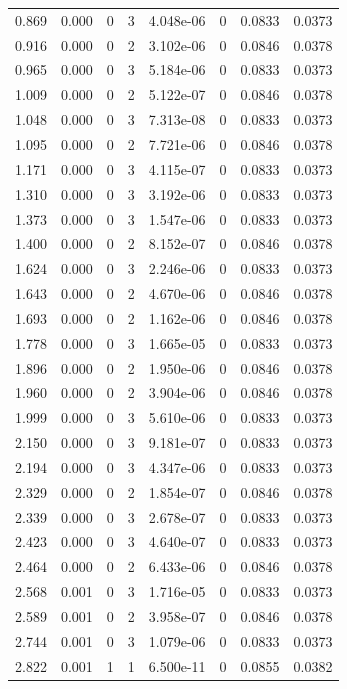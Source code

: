 \documentclass[preview]{standalone}
\begin{document}
{{\begin{tabular}{L{1.2cm}C{1.2cm} C{0.3cm}C{0.5cm} C{1.4cm}C{1.4cm} C{1.4cm}C{1.4cm}}
  0.869  &  0.000  & 0     &  3 &  4.048e-06  & 0  & 0.0833 &  0.0373   \\ 
  0.916  &  0.000  & 0     &  2 &  3.102e-06  & 0  & 0.0846 &  0.0378   \\ 
  0.965  &  0.000  & 0     &  3 &  5.184e-06  & 0  & 0.0833 &  0.0373   \\ 
  1.009  &  0.000  & 0     &  2 &  5.122e-07  & 0  & 0.0846 &  0.0378   \\ 
  1.048  &  0.000  & 0     &  3 &  7.313e-08  & 0  & 0.0833 &  0.0373   \\ 
  1.095  &  0.000  & 0     &  2 &  7.721e-06  & 0  & 0.0846 &  0.0378   \\ 
  1.171  &  0.000  & 0     &  3 &  4.115e-07  & 0  & 0.0833 &  0.0373   \\ 
  1.310  &  0.000  & 0     &  3 &  3.192e-06  & 0  & 0.0833 &  0.0373   \\ 
  1.373  &  0.000  & 0     &  3 &  1.547e-06  & 0  & 0.0833 &  0.0373   \\ 
  1.400  &  0.000  & 0     &  2 &  8.152e-07  & 0  & 0.0846 &  0.0378   \\ 
  1.624  &  0.000  & 0     &  3 &  2.246e-06  & 0  & 0.0833 &  0.0373   \\ 
  1.643  &  0.000  & 0     &  2 &  4.670e-06  & 0  & 0.0846 &  0.0378   \\ 
  1.693  &  0.000  & 0     &  2 &  1.162e-06  & 0  & 0.0846 &  0.0378   \\ 
  1.778  &  0.000  & 0     &  3 &  1.665e-05  & 0  & 0.0833 &  0.0373   \\ 
  1.896  &  0.000  & 0     &  2 &  1.950e-06  & 0  & 0.0846 &  0.0378   \\ 
  1.960  &  0.000  & 0     &  2 &  3.904e-06  & 0  & 0.0846 &  0.0378   \\ 
  1.999  &  0.000  & 0     &  3 &  5.610e-06  & 0  & 0.0833 &  0.0373   \\ 
  2.150  &  0.000  & 0     &  3 &  9.181e-07  & 0  & 0.0833 &  0.0373   \\ 
  2.194  &  0.000  & 0     &  3 &  4.347e-06  & 0  & 0.0833 &  0.0373   \\ 
  2.329  &  0.000  & 0     &  2 &  1.854e-07  & 0  & 0.0846 &  0.0378   \\ 
  2.339  &  0.000  & 0     &  3 &  2.678e-07  & 0  & 0.0833 &  0.0373   \\ 
  2.423  &  0.000  & 0     &  3 &  4.640e-07  & 0  & 0.0833 &  0.0373   \\ 
  2.464  &  0.000  & 0     &  2 &  6.433e-06  & 0  & 0.0846 &  0.0378   \\ 
  2.568  &  0.001  & 0     &  3 &  1.716e-05  & 0  & 0.0833 &  0.0373   \\ 
  2.589  &  0.001  & 0     &  2 &  3.958e-07  & 0  & 0.0846 &  0.0378   \\ 
  2.744  &  0.001  & 0     &  3 &  1.079e-06  & 0  & 0.0833 &  0.0373   \\ 
  2.822  &  0.001  & 1     &  1 &  6.500e-11  & 0  & 0.0855 &  0.0382   \\ 
\hline 
\end{tabular} 

}}
\end{document}
